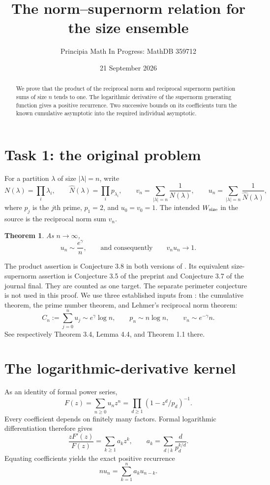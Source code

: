 \documentclass[11pt]{article}
\title{The norm--supernorm relation for the size ensemble}
\author{Principia Math In Progress: MathDB 359712}
\date{21 September 2026}
\newtheorem{theorem}{Theorem}
\begin{document}
\maketitle
\begin{abstract}
We prove that the product of the reciprocal norm and reciprocal supernorm
partition sums of size $n$ tends to one. The logarithmic derivative of the
supernorm generating function gives a positive recurrence. Two successive
bounds on its coefficients turn the known cumulative asymptotic into the
required individual asymptotic.
\end{abstract}

\section*{Task 1: the original problem}
For a partition $\lambda$ of size $|\lambda|=n$, write
\[
 N(\lambda)=\prod_i\lambda_i,\qquad
 \widehat N(\lambda)=\prod_i p_{\lambda_i},\qquad
 v_n=\sum_{|\lambda|=n}\frac1{N(\lambda)},\qquad
 u_n=\sum_{|\lambda|=n}\frac1{\widehat N(\lambda)},
\]
where $p_j$ is the $j$th prime, $p_1=2$, and $u_0=v_0=1$.
The intended $W_{\rm size}$ in the source is the reciprocal norm sum $v_n$.

\begin{theorem}\label{thm:main}
As $n\to\infty$,
\[
                     u_n\sim\frac{e^\gamma}{n},
 \qquad\text{and consequently}\qquad v_nu_n\longrightarrow1.
\]
\end{theorem}

The product assertion is Conjecture 3.8 in both versions of \cite{LS}.
Its equivalent size-supernorm assertion is Conjecture 3.5 of the preprint
and Conjecture 3.7 of the journal final. They are counted as one target.
The separate perimeter conjecture is not used in this proof. We use three
established inputs from \cite{LS}: the cumulative theorem, the prime number
theorem, and Lehmer's reciprocal norm theorem:
\begin{equation}\label{eq:inputs}
 C_n:=\sum_{j=0}^n u_j\sim e^\gamma\log n,
 \qquad p_n\sim n\log n,
 \qquad v_n\sim e^{-\gamma}n.
\end{equation}
See respectively Theorem 3.4, Lemma 4.4, and Theorem 1.1 there.

\section*{The logarithmic-derivative kernel}
As an identity of formal power series,
\[
 F(z)=\sum_{n\ge0}u_nz^n
     =\prod_{d\ge1}(1-z^d/p_d)^{-1}.
\]
Every coefficient depends on finitely many factors. Formal logarithmic
differentiation therefore gives
\begin{equation}\label{eq:kernel}
 \frac{zF'(z)}{F(z)}=\sum_{k\ge1}a_kz^k,
 \qquad a_k=\sum_{d\mid k}\frac{d}{p_d^{k/d}}.
\end{equation}
Equating coefficients yields the exact positive recurrence
\begin{equation}\label{eq:rec}
                    nu_n=\sum_{k=1}^n a_k u_{n-k}.
\end{equation}
\end{document}
